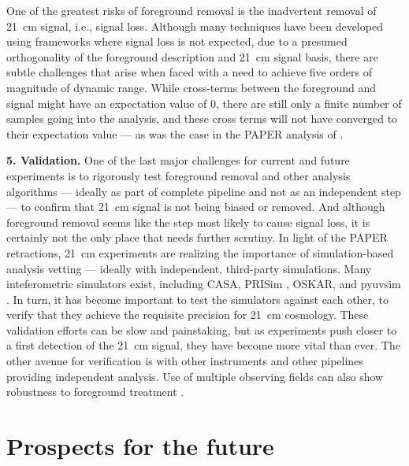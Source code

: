 One of the greatest risks of foreground removal is the inadvertent removal of 21~cm signal, i.e., signal loss.  Although many techniques have been developed using frameworks where signal loss is not expected, due to a presumed orthogonality of the foreground description and 21~cm signal basis, there are subtle challenges that arise when faced with a need to achieve five orders of magnitude of dynamic range.  While cross-terms between the foreground and signal might have an expectation value of 0, there are still only a finite number of samples going into the analysis, and these cross terms will not have converged to their expectation value --- as was the case in the PAPER analysis of \cite{ali15}.

\textbf{5. Validation.} One of the last major challenges for current and future experiments is to rigorously test foreground removal and other analysis algorithms --- ideally as part of complete pipeline and not as an independent step --- to confirm that 21~cm signal is not being biased or removed.  And although foreground removal seems like the step most likely to cause signal loss, it is certainly not the only place that needs further scrutiny.  In light of the PAPER retractions, 21~cm experiments are realizing the importance of simulation-based analysis vetting --- ideally with independent, third-party simulations.  Many inteferometric simulators exist, including CASA, PRISim \cite{thyagarajan15a}, OSKAR, and pyuvsim \cite{lanman19}.  In turn, it has become important to test the simulators against each other, to verify that they achieve the requisite precision for 21~cm cosmology.  These validation efforts can be slow and painstaking, but as experiments push closer to a first detection of the 21~cm signal, they have become more vital than ever. The other avenue for verification is with other instruments and other pipelines providing independent analysis. Use of multiple observing fields can also show robustness to foreground treatment \cite{trott19_kde}.

\section{Prospects for the future}
\label{sec:prospects}

